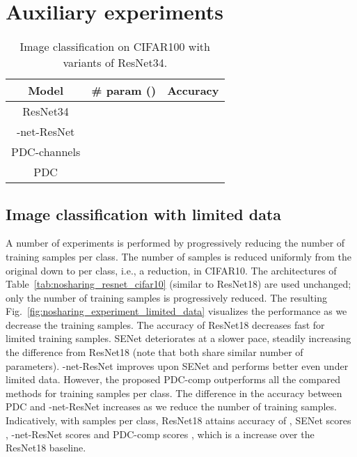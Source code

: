 \documentclass[runningheads]{llncs}
\newcommand{\resnet}{ResNet}
\newcommand{\modelres}{-net-\resnet}
\newcommand{\sne}{SENet}
\newcommand{\noshare}{PDC}
\begin{document}
\section{Auxiliary experiments}


\begin{table}[h]
\centering
    \caption{Image classification on CIFAR100 with variants of \resnet34.} 
     \begin{tabular}{|c | c | c|}
         \hline
         \textbf{Model} & \textbf{\# param ()} & \textbf{Accuracy}\\
        \hline
         \resnet34 &  & \\\hline
         \modelres &   & \\\hline
         \noshare-channels &  & \\\hline  
         \noshare &   & \\\hline
     \end{tabular}
     
 \label{tab:nosharing_resnet_cifar100_resnet34}
\end{table}





\subsection{Image classification with limited data}
\label{ssec:nosharing_experiments_limited_data}

A number of experiments is performed by progressively reducing the number of training samples per class. The number of samples is reduced uniformly from the original  down to  per class, i.e., a  reduction, in CIFAR10. The architectures of Table~\ref{tab:nosharing_resnet_cifar10} (similar to \resnet18) are used unchanged; only the number of training samples is progressively reduced. The resulting Fig.~\ref{fig:nosharing_experiment_limited_data} visualizes the performance as we decrease the training samples. The accuracy of \resnet18 decreases fast for limited training samples. \sne{} deteriorates at a slower pace, steadily increasing the difference from \resnet18 (note that both share similar number of parameters). \modelres{} improves upon \sne{} and performs better even under limited data. However, the proposed \noshare-comp outperforms all the compared methods for  training samples per class. The difference in the accuracy between \noshare{} and \modelres{} increases as we reduce the number of training samples. Indicatively, with  samples per class, \resnet18 attains accuracy of , \sne{} scores , \modelres{} scores  and \noshare-comp scores , which is a  increase over the \resnet18 baseline. 
\end{document}
